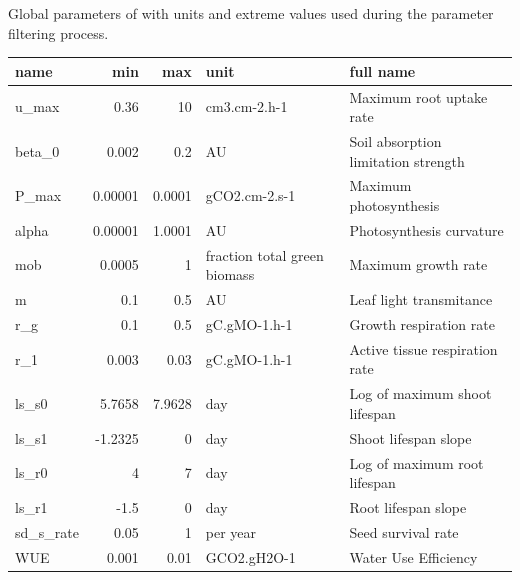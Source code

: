 \begin{table2*}
\centering
\caption[Parameters of \model]{Global parameters of \model with units and extreme values used during the parameter filtering process.}
\label{table:priors}
\begin{tabular}{lrrll}
name        & min     & max    & unit                         & full name                                         \\ \hline
u\_max      & 0.36    & 10     & cm3.cm-2.h-1                 & Maximum root uptake rate                           \\
beta\_0     & 0.002   & 0.2    & AU        		              & Soil absorption limitation strength                \\
P\_max      & 0.00001 & 0.0001 & gCO2.cm-2.s-1                & Maximum photosynthesis                             \\
alpha       & 0.00001 & 1.0001 & AU                           & Photosynthesis curvature                           \\
mob         & 0.0005  & 1      & fraction total green biomass & Maximum growth rate                                \\
m           & 0.1     & 0.5    & AU                           & Leaf light transmitance                            \\
r\_g        & 0.1     & 0.5    & gC.gMO-1.h-1                 & Growth respiration rate                            \\
r\_1        & 0.003   & 0.03   & gC.gMO-1.h-1                 & Active tissue respiration rate                     \\
ls\_s0      & 5.7658  & 7.9628 & day                          & Log of maximum shoot lifespan                      \\
ls\_s1      & -1.2325 & 0      & day                          & Shoot lifespan slope                               \\
ls\_r0      & 4       & 7      & day                          & Log of maximum root lifespan                       \\
ls\_r1      & -1.5    & 0      & day                          & Root lifespan slope                                \\
sd\_s\_rate & 0.05    & 1      & per year                     & Seed survival rate                                 \\
WUE         & 0.001   & 0.01   & GCO2.gH2O-1                  & Water Use Efficiency                               \\

\end{tabular}
\end{table2*}
